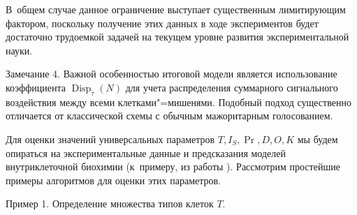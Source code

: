 В~общем случае данное ограничение выступает существенным лимитирующим фактором, поскольку получение этих данных в ходе экспериментов будет достаточно трудоемкой задачей на текущем уровне развития экспериментальной науки.



\smallskip



{\small\sc Замечание 4.} Важной особенностью итоговой модели является использование коэффициента $\operatorname{Disp}_{\acute{\tau}}(N)$ для учета распределения суммарного сигнального воздействия между всеми клетками"=мишенями. Подобный подход существенно отличается от классической схемы с обычным мажоритарным голосованием.



 \smallskip

 


 

 


Для оценки значений универсальных параметров $T, I_{S}, \operatorname{Pr}, D, O, K$ мы будем опираться на экспериментальные данные и предсказания моделей внутриклеточной биохимии (к~примеру, из работы \cite{Nazarov:bib:Nazarov2016}). Рассмотрим простейшие примеры алгоритмов для оценки этих параметров. %


 

\smallskip



\hypertarget{naz:ex:1}{} 

 

{\small\sc Пример 1}. Определение множества типов клеток $T$.



